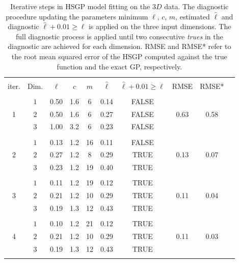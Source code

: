 \begin{table}
\centering
\setlength{\tabcolsep}{3.6pt}
\begin{tabular}{cccccccccc}
\arrayrulecolor{gray}\hline \\[-3mm]
 iter. & Dim. & $\ell$ & $c$ & $m$ & $\hat{\ell}$ & $\hat{\ell} + 0.01 \geq \ell$ & RMSE & RMSE* \\ 
\arrayrulecolor{lightgray}\hline \\[-2mm]
 \multirow{3}{*}{ 1 } & $1$ & 0.50 & 1.6 & 6 & 0.14 & FALSE & \multirow{3}{*}{ 0.63 } & \multirow{3}{*}{ 0.58 }\\ 
 & $2$ & 0.50 & 1.6 & 6 & 0.27 & FALSE &  &  \\
 & $3$ & 1.00 & 3.2 & 6 & 0.23 & FALSE &  &  \\
\arrayrulecolor{lightgray}\hline \\[-2mm]
 \multirow{3}{*}{ 2 } & $1$ & 0.13 & 1.2 & 16 & 0.11 & FALSE  & \multirow{3}{*}{ 0.13 } & \multirow{3}{*}{ 0.07 }\\
 & $2$ & 0.27 & 1.2 & 8 & 0.29 & TRUE &  &  \\
 & $3$ & 0.23 & 1.2 & 19 & 0.40 & TRUE &  &  \\
\arrayrulecolor{lightgray}\hline \\[-2mm]
 \multirow{3}{*}{ 3 } & $1$ & 0.11 & 1.2 & 19 & 0.12 & TRUE  & \multirow{3}{*}{ 0.11 } & \multirow{3}{*}{ 0.04 }\\
 & $2$ & 0.21 & 1.2 & 10 & 0.29 & TRUE &  &  \\
 & $3$ & 0.19 & 1.3 & 12 & 0.43 & TRUE &  &  \\
 \arrayrulecolor{lightgray}\hline \\[-2mm]
 \multirow{3}{*}{ 4 } & $1$ & 0.10 & 1.2 & 21 & 0.12 & TRUE  & \multirow{3}{*}{ 0.11 } & \multirow{3}{*}{ 0.03 }\\
 & $2$ & 0.21 & 1.2 & 10 & 0.29 & TRUE &  &  \\
 & $3$ & 0.19 & 1.3 & 12 & 0.43 & TRUE &  &  \\[1mm] 
\arrayrulecolor{lightgray}\hline
 \multicolumn{9}{l}{{\small Exact GP length-scales:} $\ell_{1_{GP}}=0.11$, \,$\ell_{2_{GP}}=0.32$, \, $\ell_{3_{GP}}=0.43$ }
\end{tabular}
\caption{Iterative steps in HSGP model fitting on the $3D$ data. The diagnostic procedure updating the parameters minimum $\ell$, $c$, $m$, estimated $\hat{\ell}$ and diagnostic $\hat{\ell} + 0.01 \geq \ell$ is applied on the three input dimensions. The full diagnostic process is applied until two consecutive \textit{trues} in the diagnostic are achieved for each dimension. RMSE and RMSE* refer to the root mean squared error of the HSGP computed against the true function and the exact GP, respectively.}
  \label{tab_caseIII_3D}
\end{table}

